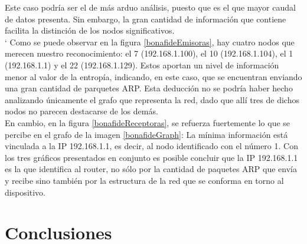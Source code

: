 Este caso podr\'ia ser el de m\'as arduo an\'alisis, puesto que es el que mayor caudal de datos presenta. Sin embargo, la gran cantidad de informaci\'on que contiene facilita la distinci\'on de los nodos significativos. \\`
Como se puede observar en la figura \ref{bonafideEmisoras}, hay cuatro nodos que merecen nuestro reconocimiento: el 7 (192.168.1.100), el 10 (192.168.1.104), el 1 (192.168.1.1) y el 22 (192.168.1.129). Estos aportan un nivel de informaci\'on menor al valor de la entrop\'ia, indicando, en este caso, que se encuentran enviando una gran cantidad de parquetes ARP. Esta deducci\'on no se podr\'ia haber hecho analizando \'unicamente el grafo que representa la red, dado que all\'i tres de dichos nodos no parecen destacarse de los dem\'as.\\

En cambio, en la figura \ref{bonafideReceptoras}, se refuerza fuertemente lo que se percibe en el grafo de la imagen \ref{bonafideGraph}: La mínima informaci\'on est\'a vinculada a la IP 192.168.1.1, es decir, al nodo identificado con el n\'umero 1. Con los tres gr\'aficos presentados en conjunto es posible concluir que la IP 192.168.1.1 es la que identifica al router, no s\'olo por la cantidad de paquetes ARP que env\'ia y recibe sino tambi\'en por la estructura de la red que se conforma en torno al dispositivo.


\section{Conclusiones}


